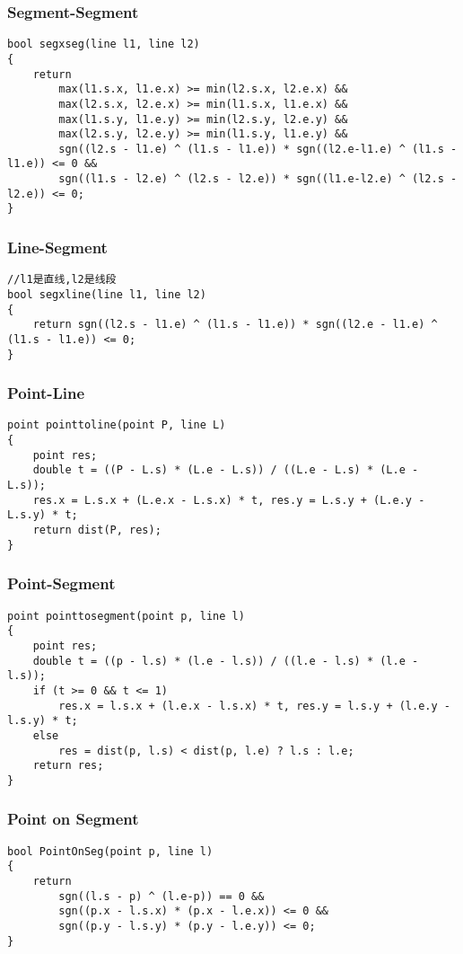 \documentclass[twoside]{article}
\begin{document}
\subsubsection{Segment-Segment}
\begin{lstlisting}
bool segxseg(line l1, line l2)
{
    return
        max(l1.s.x, l1.e.x) >= min(l2.s.x, l2.e.x) &&
        max(l2.s.x, l2.e.x) >= min(l1.s.x, l1.e.x) &&
        max(l1.s.y, l1.e.y) >= min(l2.s.y, l2.e.y) &&
        max(l2.s.y, l2.e.y) >= min(l1.s.y, l1.e.y) &&
        sgn((l2.s - l1.e) ^ (l1.s - l1.e)) * sgn((l2.e-l1.e) ^ (l1.s - l1.e)) <= 0 &&
        sgn((l1.s - l2.e) ^ (l2.s - l2.e)) * sgn((l1.e-l2.e) ^ (l2.s - l2.e)) <= 0;
}
\end{lstlisting}
\subsubsection{Line-Segment}
\begin{lstlisting}
//l1是直线,l2是线段
bool segxline(line l1, line l2)
{
    return sgn((l2.s - l1.e) ^ (l1.s - l1.e)) * sgn((l2.e - l1.e) ^ (l1.s - l1.e)) <= 0;
}
\end{lstlisting}
\subsubsection{Point-Line}
\begin{lstlisting}
point pointtoline(point P, line L)
{
    point res;
    double t = ((P - L.s) * (L.e - L.s)) / ((L.e - L.s) * (L.e - L.s));
    res.x = L.s.x + (L.e.x - L.s.x) * t, res.y = L.s.y + (L.e.y - L.s.y) * t;
    return dist(P, res);
}
\end{lstlisting}
\subsubsection{Point-Segment}
\begin{lstlisting}
point pointtosegment(point p, line l)
{
    point res;
    double t = ((p - l.s) * (l.e - l.s)) / ((l.e - l.s) * (l.e - l.s));
    if (t >= 0 && t <= 1)
        res.x = l.s.x + (l.e.x - l.s.x) * t, res.y = l.s.y + (l.e.y - l.s.y) * t;
    else
        res = dist(p, l.s) < dist(p, l.e) ? l.s : l.e;
    return res;
}
\end{lstlisting}
\subsubsection{Point on Segment}
\begin{lstlisting}
bool PointOnSeg(point p, line l)
{
    return
        sgn((l.s - p) ^ (l.e-p)) == 0 &&
        sgn((p.x - l.s.x) * (p.x - l.e.x)) <= 0 &&
        sgn((p.y - l.s.y) * (p.y - l.e.y)) <= 0;
}
\end{lstlisting}
\end{document}
